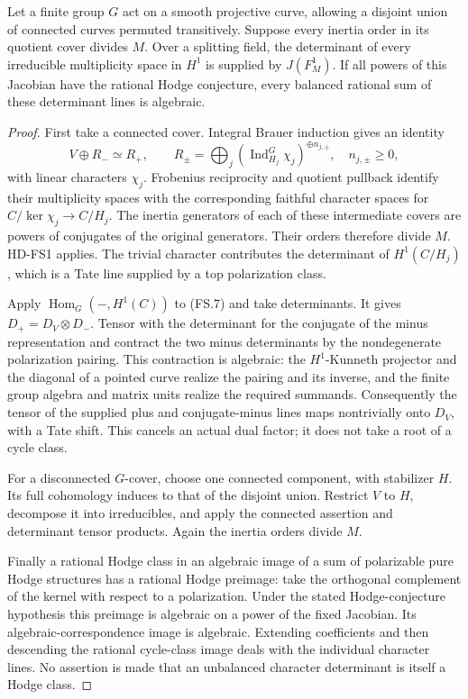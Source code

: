 \begin{theorem}
\label{HD-FS2}
Let a finite group $G$ act on a smooth projective curve, allowing a
disjoint union of connected curves permuted transitively.  Suppose
every inertia order in its quotient cover divides $M$.  Over a
splitting field, the determinant of every irreducible multiplicity
space in $H^1$ is supplied by $J(F_M^1)$.  If all powers of this
Jacobian have the rational Hodge conjecture, every balanced rational
sum of these determinant lines is algebraic.
\end{theorem}
\begin{proof}
First take a connected cover.  Integral Brauer induction
\cite[\S10.5, Theorems~19--20]{G34:Serre} gives an identity
\[
 V\oplus R_-\simeq R_+,
 \qquad R_\pm=\bigoplus_j
        (\operatorname{Ind}_{H_j}^G\chi_j)^{\oplus n_{j,\pm}},
 \quad n_{j,\pm}\ge0,
\tag{FS.7}
\]
with linear characters $\chi_j$.  Frobenius reciprocity and quotient
pullback identify their multiplicity spaces with the corresponding
faithful character spaces for
$C/\ker\chi_j\to C/H_j$.  The inertia generators of each of these
intermediate covers are powers of conjugates of the original
generators.  Their orders therefore divide $M$.  HD-FS1 applies.
The trivial character contributes the determinant of $H^1(C/H_j)$,
which is a Tate line supplied by a top polarization class.

Apply $\operatorname{Hom}_G(-,H^1(C))$ to (FS.7) and take
determinants.  It gives
$D_+=D_V\otimes D_-$.  Tensor with the determinant for the
conjugate of the minus representation and contract the two minus
determinants by the nondegenerate polarization pairing.  This
contraction is algebraic: the $H^1$-Kunneth projector and the
diagonal of a pointed curve realize the pairing and its inverse,
and the finite group algebra and matrix units realize the required
summands.  Consequently the tensor of the supplied plus and
conjugate-minus lines maps nontrivially onto $D_V$, with a Tate
shift.  This cancels an actual dual factor; it does not take a root
of a cycle class.

For a disconnected $G$-cover, choose one connected component,
with stabilizer $H$.  Its full cohomology induces to that of the
disjoint union.  Restrict $V$ to $H$, decompose it into irreducibles,
and apply the connected assertion and determinant tensor products.
Again the inertia orders divide $M$.

Finally a rational Hodge class in an algebraic image of a sum of
polarizable pure Hodge structures has a rational Hodge preimage:
take the orthogonal complement of the kernel with respect to a
polarization.  Under the stated Hodge-conjecture hypothesis this
preimage is algebraic on a power of the fixed Jacobian.  Its
algebraic-correspondence image is algebraic.  Extending coefficients
and then descending the rational cycle-class image deals with the
individual character lines.  No assertion is made that an
unbalanced character determinant is itself a Hodge class.
\end{proof}

